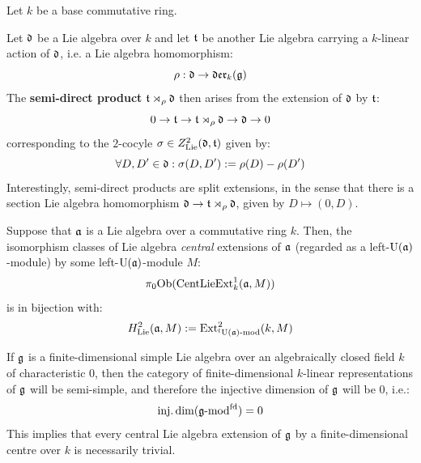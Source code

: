         \begin{example}
            Let $k$ be a base commutative ring.

            Let $\mathfrak{d}$ be a Lie algebra over $k$ and let $\mathfrak{t}$ be another Lie algebra carrying a $k$-linear action of $\mathfrak{d}$, i.e. a Lie algebra homomorphism:
                $$\rho: \mathfrak{d} \to \mathfrak{der}_k(\mathfrak{g})$$
            The \textbf{semi-direct product} $\mathfrak{t} \rtimes_{\rho} \mathfrak{d}$ then arises from the extension of $\mathfrak{d}$ by $\mathfrak{t}$:
                $$0 \to \mathfrak{t} \to \mathfrak{t} \rtimes_{\rho} \mathfrak{d} \to \mathfrak{d} \to 0$$
            corresponding to the $2$-cocyle $\sigma \in Z^2_{\mathrm{Lie}}(\mathfrak{d}, \mathfrak{t})$ given by:
                $$\forall D, D' \in \mathfrak{d}: \sigma(D, D') := \rho(D) - \rho(D')$$
            Interestingly, semi-direct products are split extensions, in the sense that there is a section Lie algebra homomorphism $\mathfrak{d} \to \mathfrak{t} \rtimes_{\rho} \mathfrak{d}$, given by $D \mapsto (0, D)$.
        \end{example}
        \begin{proposition}[$H^2_{\Lie}$ = central extensions]
            \cite[Theorem VIII.3.3]{hilton_stammbach_homological_algebra} Suppose that $\mathfrak{a}$ is a Lie algebra over a commutative ring $k$. Then, the isomorphism classes of Lie algebra \textit{central} extensions of $\mathfrak{a}$ (regarded as a left-$\mathrm{U}(\mathfrak{a})$-module) by some left-$\mathrm{U}(\mathfrak{a})$-module $M$:
                $$\pi_0\mathrm{Ob}( \mathrm{Cent}\mathrm{Lie}\mathrm{Ext}^1_k(\mathfrak{a}, M) )$$
            is in bijection with:
                $$H^2_{\mathrm{Lie}}(\mathfrak{a}, M) := \mathrm{Ext}^2_{{}^l\mathrm{U}(\mathfrak{a})\text{-}\mathrm{mod}}(k, M)$$
        \end{proposition}
        \begin{example}
            If $\mathfrak{g}$ is a finite-dimensional simple Lie algebra over an algebraically closed field $k$ of characteristic $0$, then the category of finite-dimensional $k$-linear representations of $\mathfrak{g}$ will be semi-simple, and therefore the injective dimension of $\mathfrak{g}$ will be $0$, i.e.:
                $$\operatorname{inj.dim}(\mathfrak{g}\text{-}\mathrm{mod}^{\mathrm{fd}}) = 0$$
            This implies that every central Lie algebra extension of $\mathfrak{g}$ by a finite-dimensional centre over $k$ is necessarily trivial. 
        \end{example}

